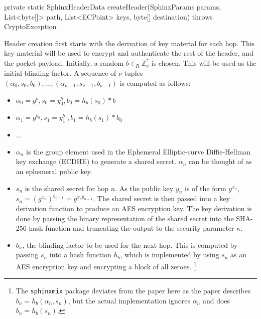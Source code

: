 \documentclass[12pt,a4paper,twoside,openright]{report}
\begin{document}
\begin{javacode}
private static SphinxHeaderData createHeader(SphinxParams params,
	List<byte[]> path,
	List<ECPoint> keys,
	byte[] destination) throws CryptoException
\end{javacode}

Header creation first starts with the derivation of key material for each hop. This key material will be used to encrypt and authenticate the rest of the header, and the packet payload. Initially, a random $b \in_R \mathbb{Z}^*_q$ is chosen. This will be used as the initial blinding factor. A sequence of $\nu$ tuples $(\alpha_0, s_0, b_0),...,(\alpha_{\nu-1}, s_{\nu-1}, b_{\nu-1})$ is computed as follows:
\\
\begin{itemize}
	\setlength\itemsep{-0.4em}
	\item $\alpha_0 = g^b, s_0 = y_0^b, b_0 = h_b(s_0)*b$
	\item $\alpha_1 = g^{b_0}, s_1 = y_1^{b_0}, b_1 = h_b(s_1)*b_0$
	\item ...
\end{itemize}

\begin{itemize}
	\item $\alpha_n$ is the group element used in the Ephemeral Elliptic-curve Diffie-Hellman key exchange (ECDHE) to generate a shared secret. $\alpha_n$ can be thought of as an ephemeral public key. 
	
	\item $s_n$ is the shared secret for hop $n$. 
	As the public key $y_n$ is of the form $g^{x_n}$, $s_n = (g^{x_n})^{b_{n-1}} = g^{{x_n}{b_{n-1}}}$. The shared secret is then passed into a key derivation function to produce an AES encryption key. The key derivation is done by passing the binary representation of the shared secret into the SHA-256 hash function and truncating the output to the security parameter $\kappa$.
	
	\item $b_n$, the blinding factor to be used for the next hop. This is computed by passing $s_n$ into a hash function $h_b$, which is implemented by using $s_n$ as an AES encryption key and encrypting a block of all zeroes. \footnote{The \verb|sphinxmix| package deviates from the paper here as the paper describes $b_n = h_b(\alpha_n, s_n)$, but the actual implementation ignores $\alpha_n$ and does $b_n = h_b(s_n)$.}
\end{itemize}
\end{document}
